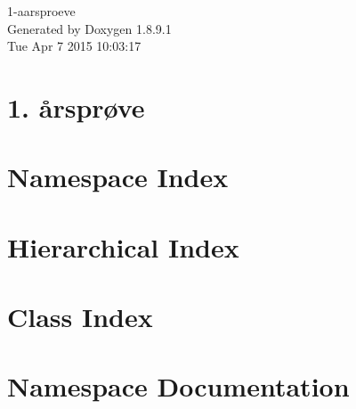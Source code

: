 \documentclass[twoside]{book}
\newcommand{\+}{\discretionary{\mbox{\scriptsize$\hookleftarrow$}}{}{}}
\newcommand{\clearemptydoublepage}{%
  \newpage{\pagestyle{empty}\cleardoublepage}%
}
\begin{document}
\hypersetup{pageanchor=false,
             bookmarks=true,
             bookmarksnumbered=true,
             pdfencoding=unicode
            }
\begin{titlepage}
\vspace*{7cm}
\begin{center}%
{\Large 1-\/aarsproeve }\\
\vspace*{1cm}
{\large Generated by Doxygen 1.8.9.1}\\
\vspace*{0.5cm}
{\small Tue Apr 7 2015 10:03:17}\\
\end{center}
\end{titlepage}
\clearemptydoublepage
\tableofcontents
\clearemptydoublepage
{}
\hypersetup{pageanchor=true}

\chapter{1. årsprøve}
\label{md__documents__git_hub_1-aarsproeve__r_e_a_d_m_e}
\hypertarget{md__documents__git_hub_1-aarsproeve__r_e_a_d_m_e}{}

\chapter{Namespace Index}

\chapter{Hierarchical Index}

\chapter{Class Index}

\chapter{Namespace Documentation}












\end{document}

